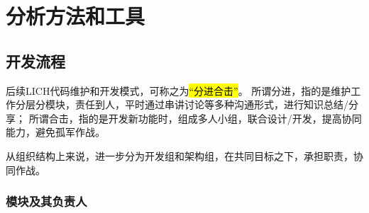 \chapter{分析方法和工具}

\section{开发流程}

后续LICH代码维护和开发模式，可称之为\hl{“分进合击”}。
所谓分进，指的是维护工作分层分模块，责任到人，平时通过串讲讨论等多种沟通形式，进行知识总结/分享；
所谓合击，指的是开发新功能时，组成多人小组，联合设计/开发，提高协同能力，避免孤军作战。

从组织结构上来说，进一步分为开发组和架构组，在共同目标之下，承担职责，协同作战。

\subsection{模块及其负责人}

